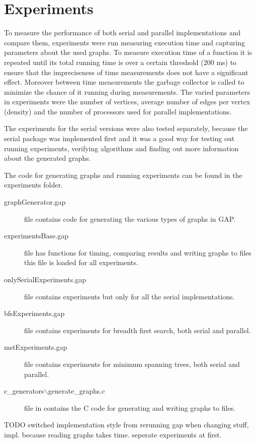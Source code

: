 \documentclass{report}
\theoremstyle{plain}
\theoremstyle{definition}
\theoremstyle{remark}
\begin{document}
\section{Experiments}

To measure the performance of both serial and parallel implementations and compare them, experiments were run measuring execution time and capturing parameters about the used graphs. To measure execution time of a function it is repeated until its total running time is over a certain threshold (200 ms) to ensure that the impreciseness of time measurements does not have a significant effect. Moreover between time measurements the garbage collector is called to minimize the chance of it running during measurements. The varied parameters in experiments were the number of vertices, average number of edges per vertex (density) and the number of processors used for parallel implementations.

The experiments for the serial versions were also tested separately, because the serial package was implemented first and it was a good way for testing out running experiments, verifying algorithms and finding out more information about the generated graphs.

The code for generating graphs and running experiments can be found in the experiments folder.
\begin{description}
\item[graphGenerator.gap] file contains code for generating the various types of graphs in GAP.
\item[experimentsBase.gap] file has functions for timing, comparing results and writing graphs to files this file is loaded for all experiments.
\item[onlySerialExperiments.gap] file contains experiments but only for all the serial implementations.
\item[bfsExperiments.gap] file contains experiments for breadth first search, both serial and parallel.
\item[mstExperiments.gap] file contains experiments for minimum spanning trees, both serial and parallel.
\item[c\_generators$\backslash$generate\_graphs.c] file in contains the C code for generating and writing graphs to files.
\end{description}

TODO switched implementation style from rerunning gap when changing stuff, impl. because reading graphs takes time. seperate experiments at first.
\end{document}

